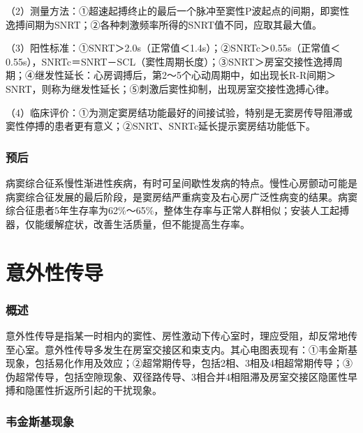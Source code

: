 （2）测量方法：①超速起搏终止的最后一个脉冲至窦性P波起点的间期，即窦性逸搏间期为SNRT；②各种刺激频率所得的SNRT值不同，应取其最大值。

（3）阳性标准：①SNRT＞2.0s（正常值＜1.4s）；②SNRTc＞0.55s（正常值＜0.55s），SNRTc＝SNRT－SCL（窦性周期长度）；③SNRT＞房室交接性逸搏周期；④继发性延长：心房调搏后，第2～5个心动周期中，如出现长R-R间期＞SNRT，则称为继发性延长；⑤刺激后窦性抑制，出现房室交接性逸搏心律。

（4）临床评价：①为测定窦房结功能最好的间接试验，特别是无窦房传导阻滞或窦性停搏的患者更有意义；②SNRT、SNRTc延长提示窦房结功能低下。

\protect\hypertarget{text00034.htmlux5cux23subid413}{}{}

\subsection{预后}

病窦综合征系慢性渐进性疾病，有时可呈间歇性发病的特点。慢性心房颤动可能是病窦综合征发展的最后阶段，是窦房结严重病变及右心房广泛性病变的结果。病窦综合征患者5年生存率为62\%～65\%，整体生存率与正常人群相似；安装人工起搏器，仅能缓解症状，改善生活质量，但不能提高生存率。

\protect\hypertarget{text00035.html}{}{}

\protect\hypertarget{text00035.htmlux5cux23chapter35}{}{}

\chapter{意外性传导}

\protect\hypertarget{text00035.htmlux5cux23subid414}{}{}

\subsection{概述}

意外性传导是指某一时相内的窦性、房性激动下传心室时，理应受阻，却反常地传至心室。意外性传导多发生在房室交接区和束支内。其心电图表现有：①韦金斯基现象，包括易化作用及效应；②超常期传导，包括2相、3相及4相超常期传导；③伪超常传导，包括空隙现象、双径路传导、3相合并4相阻滞及房室交接区隐匿性早搏和隐匿性折返所引起的干扰现象。

\protect\hypertarget{text00035.htmlux5cux23subid415}{}{}

\subsection{韦金斯基现象}

